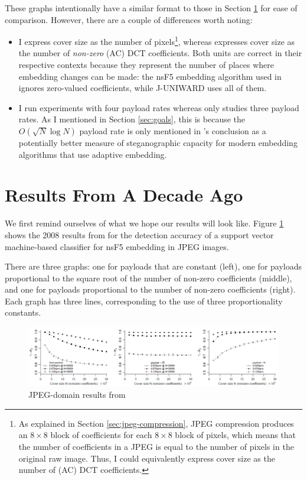 \documentclass[11pt,a4paper,twoside,openright]{report}
\begin{document}
These graphs intentionally have a similar format to those in Section \ref{sec:2008-results} for ease of comparison. However, there are a couple of differences worth noting:
\begin{itemize}
	\item I express cover size as the number of pixels\footnote{As explained in Section \ref{sec:jpeg-compression}, JPEG compression produces an $8\times8$ block of coefficients for each $8\times8$ block of pixels, which means that the number of coefficients in a JPEG is equal to the number of pixels in the original raw image. Thus, I could equivalently express cover size as the number of (AC) DCT coefficients.}, whereas \cite{2008-paper} expresses cover size as the number of \textit{non-zero} (AC) DCT coefficients. Both units are correct in their respective contexts because they represent the number of places where embedding changes can be made: the nsF5 embedding algorithm used in \cite{2008-paper} ignores zero-valued coefficients, while J-UNIWARD uses all of them.
	\item I run experiments with four payload rates whereas \cite{2008-paper} only studies three payload rates. As I mentioned in Section \ref{sec:goals}, this is because the $O(\sqrt{N} \log{N})$ payload rate is only mentioned in \cite{2008-paper}'s conclusion as a potentially better measure of steganographic capacity for modern embedding algorithms that use adaptive embedding.
\end{itemize}


\section{Results From A Decade Ago} \label{sec:2008-results}

We first remind ourselves of what we hope our results will look like. Figure \ref{fig:2008-jpeg-results} shows the 2008 results from \cite{2008-paper} for the detection accuracy of a support vector machine-based classifier for nsF5 embedding in JPEG images.

There are three graphs: one for payloads that are constant (left), one for payloads proportional to the square root of the number of non-zero coefficients (middle), and one for payloads proportional to the number of non-zero coefficients (right). Each graph has three lines, corresponding to the use of three proportionality constants.

\begin{figure}[htbp]
	\begin{center}
		\includegraphics[width=\linewidth]{2008_jpeg_results.png}
		\caption{JPEG-domain results from \cite{2008-paper}}
		\label{fig:2008-jpeg-results}
	\end{center}
\end{figure}
\end{document}
